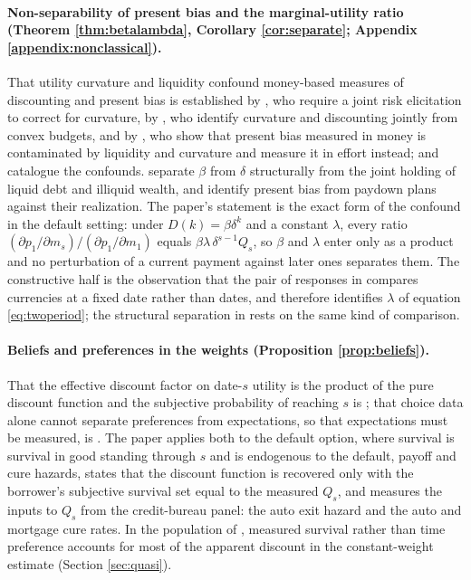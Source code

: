 \paragraph{Non-separability of present bias and the marginal-utility ratio (Theorem \ref{thm:betalambda}, Corollary \ref{cor:separate}; Appendix \ref{appendix:nonclassical}).} That utility curvature and liquidity confound money-based measures of discounting and present bias is established by \citet{andersen_eliciting_2008}, who require a joint risk elicitation to correct for curvature, by \citet{andreoni_estimating_2012}, who identify curvature and discounting jointly from convex budgets, and by \citet{augenblick_working_2015}, who show that present bias measured in money is contaminated by liquidity and curvature and measure it in effort instead; \citet{frederick_time_2002} and \citet{cohen_measuring_2020} catalogue the confounds. \citet{laibson_estimating_2024} separate $\beta$ from $\delta$ structurally from the joint holding of liquid debt and illiquid wealth, and \citet{kuchler_sticking_2021} identify present bias from paydown plans against their realization. The paper's statement is the exact form of the confound in the default setting: under $D(k) = \beta\delta^k$ and a constant $\lambda$, every ratio $(\partial p_1/\partial m_s)/(\partial p_1/\partial m_1)$ equals $\beta\lambda\,\delta^{s-1} Q_s$, so $\beta$ and $\lambda$ enter only as a product and no perturbation of a current payment against later ones separates them. The constructive half is the observation that the pair of responses in \citet{indarte_moral_2023} compares currencies at a fixed date rather than dates, and therefore identifies $\lambda$ of equation \eqref{eq:twoperiod}; the structural separation in \citet{laibson_estimating_2024} rests on the same kind of comparison.

\paragraph{Beliefs and preferences in the weights (Proposition \ref{prop:beliefs}).} That the effective discount factor on date-$s$ utility is the product of the pure discount function and the subjective probability of reaching $s$ is \citet{yaari_uncertain_1965}; that choice data alone cannot separate preferences from expectations, so that expectations must be measured, is \citet{manski_measuring_2004}. The paper applies both to the default option, where survival is survival in good standing through $s$ and is endogenous to the default, payoff and cure hazards, states that the discount function is recovered only with the borrower's subjective survival set equal to the measured $Q_s$, and measures the inputs to $Q_s$ from the credit-bureau panel: the auto exit hazard and the auto and mortgage cure rates. In the population of \citet{ganong_liquidity_2020}, measured survival rather than time preference accounts for most of the apparent discount in the constant-weight estimate (Section \ref{sec:quasi}).

